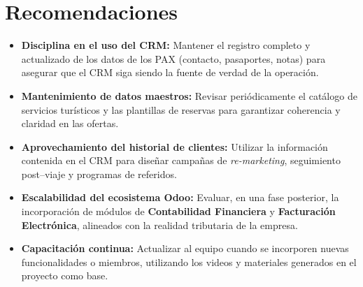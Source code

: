 \section{Recomendaciones}

\begin{itemize}
    \item \textbf{Disciplina en el uso del CRM:} Mantener el registro completo y actualizado de los datos de los PAX (contacto, pasaportes, notas) para asegurar que el CRM siga siendo la fuente de verdad de la operación.
    \item \textbf{Mantenimiento de datos maestros:} Revisar periódicamente el catálogo de servicios turísticos y las plantillas de reservas para garantizar coherencia y claridad en las ofertas.
    \item \textbf{Aprovechamiento del historial de clientes:} Utilizar la información contenida en el CRM para diseñar campañas de \textit{re-marketing}, seguimiento post--viaje y programas de referidos.
    \item \textbf{Escalabilidad del ecosistema Odoo:} Evaluar, en una fase posterior, la incorporación de módulos de \textbf{Contabilidad Financiera} y \textbf{Facturación Electrónica}, alineados con la realidad tributaria de la empresa.
    \item \textbf{Capacitación continua:} Actualizar al equipo cuando se incorporen nuevas funcionalidades o miembros, utilizando los videos y materiales generados en el proyecto como base.
\end{itemize}

